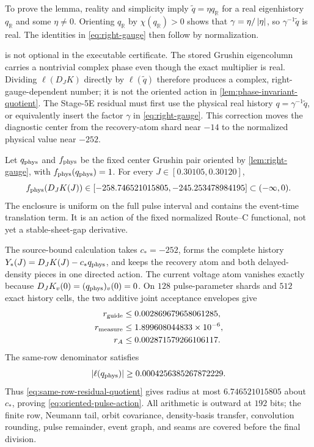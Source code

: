 To prove the lemma, reality and simplicity imply
\(\widetilde q=\eta q_{\mathbb R}\) for a real eigenhistory
\(q_{\mathbb R}\) and some \(\eta\ne0\).  Orienting
\(q_{\mathbb R}\) by \(\chi(q_{\mathbb R})>0\) shows that
\(\gamma=\eta/\left\lvert\eta\right\rvert\), so \(\gamma^{-1}\widetilde q\) is real.
The identities in \cref{eq:right-gauge} then follow by normalization.

 is not optional in the executable certificate.  The
stored Grushin eigencolumn carries a nontrivial complex phase even though
the exact multiplier is real.  Dividing \(\ell(D_JK)\) directly by
\(\ell(\widetilde q)\) therefore produces a complex, right-gauge-dependent
number; it is not the oriented action in
\cref{lem:phase-invariant-quotient}.  The Stage-5E residual must first use
the physical real history \(q=\gamma^{-1}\widetilde q\), or equivalently
insert the factor \(\gamma\) in \cref{eq:right-gauge}.  This correction moves
the diagnostic center from the recovery-atom shard near \(-14\) to the
normalized physical value near \(-252\).

\begin{theorem}
\label{thm:oriented-pulse-action}
Let \(q_{\rm phys}\) and \(f_{\rm phys}\) be the fixed center Grushin pair
oriented by \cref{lem:right-gauge}, with
\(f_{\rm phys}(q_{\rm phys})=1\).  For every
\(J\in[0.30105,0.30120]\),
\begin{equation}
 f_{\rm phys}(D_JK(J))\in
 [-258.746521015805,-245.253478984195]\subset(-\infty,0).
 \label{eq:oriented-pulse-action}
\end{equation}
The enclosure is uniform on the full pulse interval and contains the
event-time translation term.  It is an action of the fixed normalized
Route--C functional, not yet a stable-sheet-gap derivative.
\end{theorem}

The source-bound calculation takes \(c_*=-252\), forms the complete history
\(Y_*(J)=D_JK(J)-c_*q_{\rm phys}\), and keeps the recovery atom and both
delayed-density pieces in one directed action.  The current voltage atom
vanishes exactly because \(D_JK_v(0)=(q_{\rm phys})_v(0)=0\).  On \(128\)
pulse-parameter shards and \(512\) exact history cells, the two additive
joint acceptance envelopes give
\begin{align}
 r_{\rm guide}&\le0.002869679658061285,\notag\\
 r_{\rm measure}&\le1.899608044833\times10^{-6},\notag\\
 r_A&\le0.002871579266106117.                         \label{eq:stage5e-budget}
\end{align}
The same-row denominator satisfies
\begin{equation}
 |\ell(q_{\rm phys})|\ge0.0004256385267872229.       \label{eq:stage5e-denominator}
\end{equation}
Thus \cref{eq:same-row-residual-quotient} gives radius at most
\(6.746521015805\) about \(c_*\), proving
\cref{eq:oriented-pulse-action}.  All arithmetic is outward at \(192\) bits;
the finite row, Neumann tail, orbit covariance, density-basis transfer,
convolution rounding, pulse remainder, event graph, and seams are covered
before the final division.

